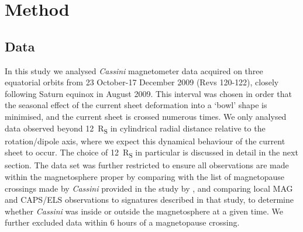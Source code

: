 \section{Method}\label{equinox:sec:method}
\subsection{Data}
In this study we analysed \textit{Cassini} magnetometer data acquired on three equatorial orbits from 23 October{\--}17 December 2009 (Revs 120{\--}122), closely following Saturn equinox in August 2009. This interval was chosen in order that the seasonal effect of the current sheet deformation into a `bowl' shape \citep[e.g.][]{arridge2008warp} is minimised, and the current sheet is crossed numerous times. We only analysed data observed beyond \SI{12}{R_S} in cylindrical radial distance relative to the rotation/dipole axis, where we expect this dynamical behaviour of the current sheet to occur. The choice of \SI{12}{R_S} in particular is discussed in detail in the next section. The data set was further restricted to ensure all observations are made within the magnetosphere proper by comparing with the list of magnetopause crossings made by \textit{Cassini} provided in the study by \citet{pilkington2015}, and comparing local MAG and CAPS/ELS observations to signatures described in that study, to determine whether \textit{Cassini} was inside or outside the magnetosphere at a given time. We further excluded data within 6 hours of a magnetopause crossing.

